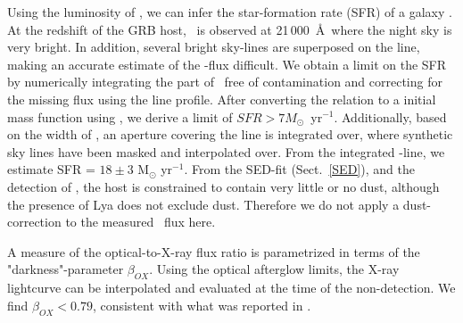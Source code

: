 \documentclass{aa}    %
\begin{document}

Using the luminosity of \ha, we can infer the star-formation rate (SFR) of a
galaxy \citep{Kennicutt1998}. At the redshift of the GRB host, \ha~is observed
at 21\,000~\AA~where the night sky is very bright. In addition, several bright
sky-lines are superposed on the line, making an accurate estimate of the
\ha-flux difficult. We obtain a limit on the SFR by numerically integrating the part of
\ha~free of contamination and correcting for the missing flux using the line
profile. After converting the \citet{Kennicutt1998} relation to a
\citet{Chabrier2003} initial mass function using \citet{Madau2014}, we derive a
limit of $SFR > 7 M_\odot$~yr$^{-1}$. Additionally, based on the
width of \oiii, an aperture covering the line is integrated over, where
synthetic sky lines \citep{Noll2012, Jones2013} have been masked and
interpolated over. From the integrated \ha-line, we estimate SFR = $18 \pm 3$
M$_\odot$ yr$^{-1}$. From the SED-fit (Sect.~\ref{SED}), and
the detection of \lya, the host is constrained to contain very little or no
dust, although the presence of Lya does not exclude dust. Therefore we do not
apply a dust-correction to the measured \ha~flux here.

A measure of the optical-to-X-ray flux ratio is parametrized in terms of the
"darkness"-parameter $\beta_{OX}$\citep{Jakobsson2004}. Using the optical
afterglow limits\citep{Cucchiara2011, Cenko2011}, the X-ray lightcurve can be
interpolated and evaluated at the time of the non-detection. We find $\beta_{OX}
< 0.79$, consistent with what was reported in \citet{Sakamoto2013}.
\end{document}
